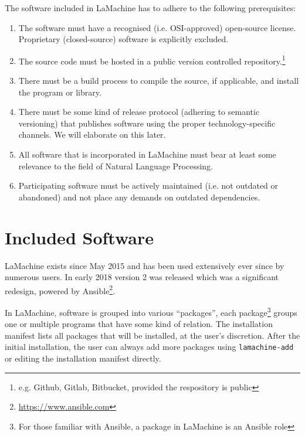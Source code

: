 \documentclass[a4paper,11pt]{article}
\begin{document}
The software included in LaMachine has to adhere to the following prerequisites:

\begin{enumerate}

    \item The software must have a recognised (i.e. OSI-approved) open-source license.
        Proprietary (closed-source) software is explicitly excluded.
    \item The source
        code must be hosted in a public version controlled repository.\footnote{e.g. Github, Gitlab, Bitbucket, provided
        the respository is public}
    \item There must be a build process to compile the source, if applicable, and install the program or library.
    \item There must be some kind of release protocol (adhering to semantic versioning) that publishes software using the proper
technology-specific channels. We will elaborate on this later.
    \item All software that is incorporated in LaMachine must bear at least some relevance to the field of Natural Language Processing.
    \item Participating software must be actively maintained (i.e. not outdated or abandoned) and not place any demands on outdated
        dependencies. %
\end{enumerate}


\section{ Included Software}

LaMachine exists since May 2015 and has been used extensively ever since by numerous users. In early 2018 version 2 was
released which was a significant redesign, powered by Ansible\footnote{\url{https://www.ansible.com}}.

In LaMachine, software is grouped into various ``packages'', each package\footnote{For those familiar with
Ansible, a package in LaMachine is an Ansible role} groups one or multiple programs that have some kind of relation. The
installation manifest lists all packages that will be installed, at the user's discretion. After the initial
installation, the user can always add more packages using \texttt{lamachine-add} or editing the installation manifest directly.
\end{document}

